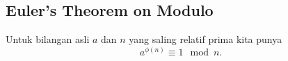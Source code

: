 \subsection{Euler's Theorem on Modulo}
Untuk bilangan asli $a$ dan $n$ yang saling relatif prima kita punya
$$a^{\phi(n)} \equiv 1 \mod n.$$


